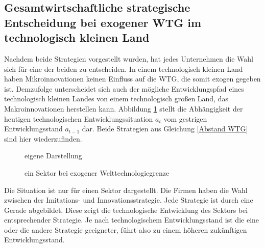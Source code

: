 \subsection{Gesamtwirtschaftliche strategische Entscheidung bei exogener WTG im technologisch kleinen Land}
Nachdem beide Strategien vorgestellt wurden, hat jedes Unternehmen die Wahl sich für eine der beiden zu entscheiden. In einem technologisch kleinen Land haben Mikroinnovationen keinen Einfluss auf die WTG, die somit exogen gegeben ist. Demzufolge unterscheidet sich auch der mögliche Entwicklungspfad eines technologisch kleinen Landes von einem technologisch großen Land, das Makroinnovationen herstellen kann. Abbildung \ref{fig:ein Sektor exogene WTG} stellt die Abhängigkeit der heutigen technologischen Entwicklungssituation $a_t$ vom gestrigen Entwicklungsstand $a_{t-1}$ dar. Beide Strategien aus Gleichung \eqref{Abstand WTG} sind hier wiederzufinden.\\
%
		\begin{figure}[H] 
			\hfill{}  eigene Darstellung
			\caption{ein Sektor bei exogener Welttechnologiegrenze}
			\label{fig:ein Sektor exogene WTG}
		\end{figure}
%				
Die Situation ist nur für einen Sektor dargestellt. Die Firmen haben die Wahl zwischen der Imitations- und Innovationsstrategie. Jede Strategie ist durch eine Gerade abgebildet. Diese zeigt die technologische Entwicklung des Sektors bei entsprechender Strategie. Je nach technologischem Entwicklungsstand ist die eine oder die andere Strategie geeigneter, führt also zu einem höheren zukünftigen Entwicklungsstand.\\ 
